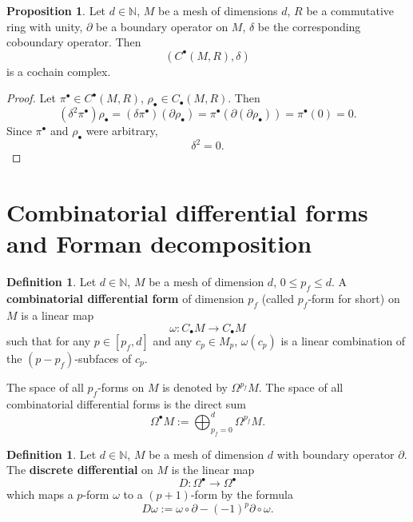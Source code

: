 \documentclass[fleqn]{article}
\theoremstyle{definition}
\newtheorem{proposition}[theorem]{Proposition}
\newtheorem{definition}[theorem]{Definition}
\begin{document}
\begin{proposition}
  Let
    $d \in \mathbb{N}$,
    $M$ be a mesh of dimensions $d$,
    $R$ be a commutative ring with unity,
    $\partial$ be a boundary operator on $M$,
    $\delta$ be the corresponding coboundary operator.
  Then
  \begin{equation}
    (C^\bullet(M, R), \delta)
  \end{equation}
  is a cochain complex.
\end{proposition}

\begin{proof}
  Let $\pi^\bullet \in C^\bullet(M, R)$, $\rho_\bullet \in C_\bullet(M, R)$.
  Then
  \begin{equation}
    (\delta^2 \pi^\bullet) \rho_\bullet
    = (\delta \pi^\bullet) (\partial \rho_\bullet)
    = \pi^\bullet (\partial (\partial \rho_\bullet))
    = \pi^\bullet (0)
    = 0.
  \end{equation}
  Since $\pi^\bullet$ and $\rho_\bullet$ were arbitrary,
  \begin{equation}
    \delta^2 = 0.
  \end{equation}
\end{proof}

\section{Combinatorial differential forms and Forman decomposition}

\begin{definition}
  Let $d \in \mathbb{N}$, $M$ be a mesh of dimension $d$, $0 \leq p_f \leq d$.
  A \textbf{combinatorial differential form} of dimension $p_f$
  (called $p_f$-form for short) on $M$ is a linear map
  \begin{equation}
    \omega \colon C_\bullet M \to C_\bullet M
  \end{equation}
  such that for any $p \in [p_f, d]$ and any $c_p \in M_p$,
  $\omega(c_p)$ is a linear combination of the $(p - p_f)$-subfaces of $c_p$.

  The space of all $p_f$-forms on $M$ is denoted by $\Omega^{p_f} M$.
  The space of all combinatorial differential forms is the direct sum
  \begin{equation}
    \Omega^\bullet M := \bigoplus_{p_f = 0}^{d} \Omega^{p_f} M.
  \end{equation}
\end{definition}

\begin{definition}
  Let $d \in \mathbb{N}$, $M$ be a mesh of dimension $d$ with boundary operator
  $\partial$.
  The \textbf{discrete differential} on $M$ is the linear map
  \begin{equation}
    D \colon \Omega^\bullet \to \Omega^\bullet
  \end{equation}
  which maps a $p$-form $\omega$ to a $(p + 1)$-form by the formula
  \begin{equation}
    D \omega := \omega \circ \partial - (-1)^p \partial \circ \omega.
  \end{equation}
\end{definition}
\end{document}
